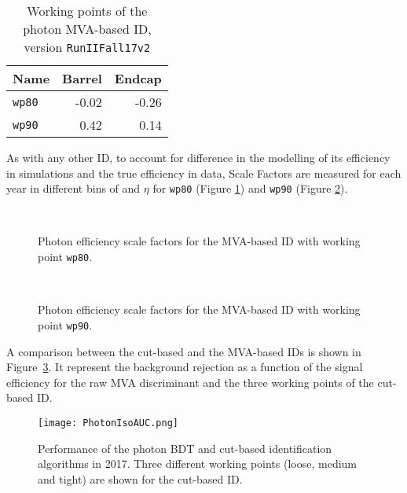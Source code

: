 \begin{table}[ht]
\caption[.]{Working points of the photon MVA-based ID, version \texttt{RunIIFall17v2}}
\label{tab:MVAwpCuts}
\centering
\begin{tabular}{lrr}
\toprule
Name & Barrel & Endcap \\
\midrule
\texttt{wp80} & -0.02 & -0.26 \\
\texttt{wp90} &  0.42 &  0.14 \\
\bottomrule
\end{tabular}
\end{table}

As with any other ID, to account for difference in the modelling of its efficiency in simulations and the true efficiency in data,
Scale Factors are measured for each year in different bins of \pt and $\eta$ for \texttt{wp80} (Figure \ref{fig:phEffMVASF_wp80}) and \texttt{wp90} (Figure \ref{fig:phEffMVASF_wp90}).

\begin{figure}
\centering
{}%
\\
\caption{Photon efficiency scale factors for the MVA-based ID with working point \texttt{wp80}.}
\label{fig:phEffMVASF_wp80}
\end{figure}

\begin{figure}
\centering
{}%
\\
\caption{Photon efficiency scale factors for the MVA-based ID with working point \texttt{wp90}.}
\label{fig:phEffMVASF_wp90}
\end{figure}

A comparison between the cut-based and the MVA-based IDs is shown in Figure~\ref{fig:PhotonIsoAUC}.
It represent the background rejection as a function of the signal efficiency for the raw MVA discriminant
and the three working points of the cut-based ID.

\begin{figure}
\centering
\texttt{[image: PhotonIsoAUC.png]}
\caption{Performance of the photon BDT and cut-based identification algorithms in 2017.
Three different working points (loose, medium and tight) are shown for the cut-based ID. \cite{CMS:photon-performance-2015}}
\label{fig:PhotonIsoAUC}
\end{figure}

